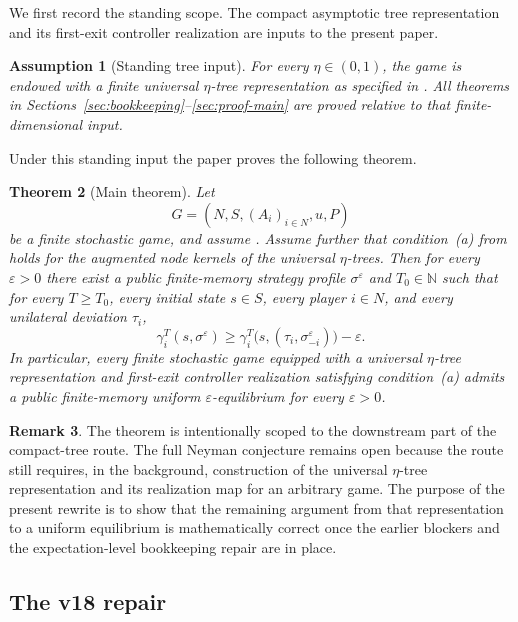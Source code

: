 \documentclass[12pt]{article}
\newtheorem{theorem}{Theorem}[section]
\newtheorem{assumption}[theorem]{Assumption}
\theoremstyle{definition}
\newtheorem{remark}[theorem]{Remark}
\newcommand{\eps}{\varepsilon}
\newcommand{\N}{\mathbb{N}}
\newcommand{\1}{\mathbf{1}}
\begin{document}
We first record the standing scope. The compact asymptotic tree representation and
its first-exit controller realization are inputs to the present paper.

\begin{assumption}[Standing tree input]
\label{ass:tree-input}
For every $\eta\in(0,1)$, the game is endowed with a finite universal
$\eta$-tree representation as specified in
. All theorems in
Sections~\ref{sec:bookkeeping}--\ref{sec:proof-main} are proved relative to that
finite-dimensional input.
\end{assumption}

Under this standing input the paper proves the following theorem.

\begin{theorem}[Main theorem]
\label{thm:main}
Let
\[
G=(N,S,(A_i)_{i\in N},u,P)
\]
be a finite stochastic game, and assume . Assume further
that condition~\textnormal{(a)} from  holds for the augmented node
kernels of the universal $\eta$-trees. Then for every $\eps>0$ there exist a
public finite-memory strategy profile $\sigma^\eps$ and $T_0\in\N$ such that for
every $T\ge T_0$, every initial state $s\in S$, every player $i\in N$, and every
unilateral deviation $\tau_i$,
\[
\gamma_i^T(s,\sigma^\eps)
\ge
\gamma_i^T\bigl(s,(\tau_i,\sigma^\eps_{-i})\bigr)-\eps.
\]
In particular, every finite stochastic game equipped with a universal
$\eta$-tree representation and first-exit controller realization satisfying
condition~\textnormal{(a)} admits a public finite-memory uniform
$\eps$-equilibrium for every $\eps>0$.
\end{theorem}

\begin{remark}
The theorem is intentionally scoped to the downstream part of the compact-tree
route. The full Neyman conjecture remains open because the route still requires,
in the background, construction of the universal $\eta$-tree representation and
its realization map for an arbitrary game. The purpose of the present rewrite is
to show that the remaining argument from that representation to a uniform
equilibrium is mathematically correct once the earlier blockers and the
expectation-level bookkeeping repair are in place.
\end{remark}



\subsection{The v18 repair}
\end{document}
